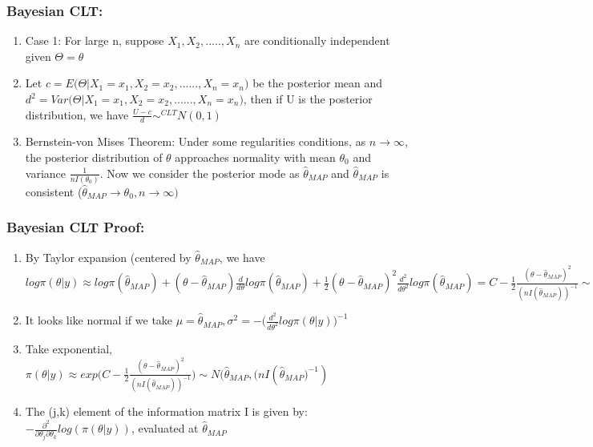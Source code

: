 \documentclass{beamer}
\begin{document}
\begin{frame}
\frametitle{Bayesian CLT:}

\begin{enumerate}
\item Case 1: For large n, suppose $X_1,X_2, .....,X_n$ are conditionally independent given $\Theta = \theta$

\item Let $c = E\Big(\Theta|X_1 = x_1, X_2 = x_2, ......, X_n = x_n\Big)$ be the posterior mean and $d^2 = Var\Big(\Theta|X_1 = x_1, X_2 = x_2, ......, X_n = x_n\Big)$, then if U is the posterior distribution, we have $\frac{U-c}{d} \sim^{CLT} N(0,1)$

\item Bernstein-von Mises Theorem: Under some regularities conditions, as $n \rightarrow \infty$, the posterior distribution of $\theta$ approaches normality with mean $\theta_0$ and variance $\frac{1}{nI(\theta_0)}$. Now we consider the posterior mode as $\hat \theta_{MAP}$ and $\hat \theta_{MAP}$ is consistent ($\hat \theta_{MAP} \rightarrow \theta_0, n\rightarrow \infty)$



\end{enumerate}

\end{frame}


\begin{frame}
\frametitle{Bayesian CLT Proof:}

\begin{enumerate}
\item By Taylor expansion (centered by $\hat \theta_{MAP}$, we have $log \pi(\theta|y) \approx log \pi(\hat \theta_{MAP}) + (\theta - \hat \theta_{MAP}) \frac{d}{d\theta}log \pi(\hat \theta_{MAP}) + \frac{1}{2} (\theta - \hat \theta_{MAP})^2 \frac{d^2}{d\theta^2}log \pi(\hat \theta_{MAP}) = C - \frac{1}{2} \frac{(\theta - \hat \theta_{MAP})^2}{(nI(\hat \theta_{MAP}))^{-1}} \sim C - \frac{1}{2} \Big(\frac{\theta-\mu}{\sigma}\Big)^2$ 

\item It looks like normal if we take $\mu= \hat\theta_{MAP}, \sigma^2 = -\Big(\frac{d^2}{d\theta^2}log \pi(\theta|y)\Big)^{-1}$

\item Take exponential, $\pi(\theta|y) \approx exp\Big( C -\frac{1}{2} \frac{(\theta - \hat \theta_{MAP})^2}{(nI(\hat \theta_{MAP}))^{-1}}\Big) \sim N(\hat \theta_{MAP}, \Big(nI(\hat \theta_{MAP}\Big)^{-1})$

\item The (j,k) element of the information matrix I is given by: $-\frac{\partial^2}{\partial \theta_j \partial \theta_k} log(\pi(\theta|y))$, evaluated at $\hat \theta_{MAP}$

\end{enumerate}

\end{frame}
\end{document}
